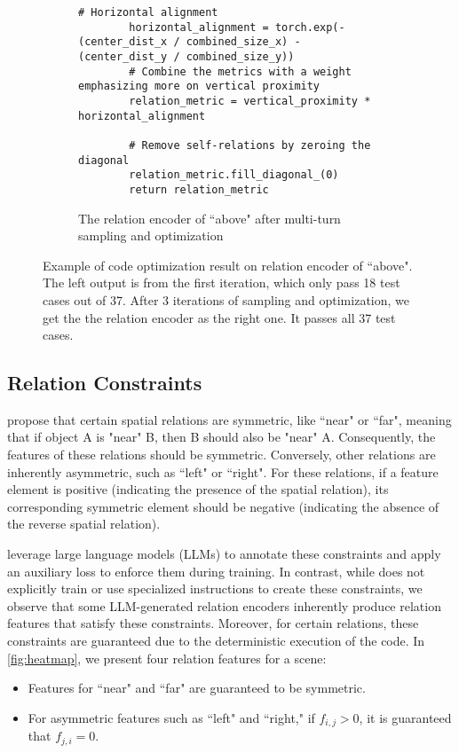 \begin{figure*}[htbp]
\begin{subfigure}{0.45\textwidth}
\begin{lstlisting}[style=pythonstyle]
        # Horizontal alignment
        horizontal_alignment = torch.exp(-(center_dist_x / combined_size_x) - (center_dist_y / combined_size_y))
        # Combine the metrics with a weight emphasizing more on vertical proximity
        relation_metric = vertical_proximity * horizontal_alignment
        
        # Remove self-relations by zeroing the diagonal
        relation_metric.fill_diagonal_(0)
        return relation_metric
\end{lstlisting}
        \caption{The relation encoder of ``above" after multi-turn sampling and optimization}
        \label{fig:subfig-b}
    \end{subfigure}
    
    \caption{Example of code optimization result on relation encoder of ``above". The left output is from the first iteration, which only pass 18 test cases out of 37. After 3 iterations of sampling and optimization, we get the the relation encoder as the right one. It passes all 37 test cases.}
    \label{fig:main}
\end{figure*}

\subsection{Relation Constraints}
\cite{feng2024naturally} propose that certain spatial relations are symmetric, like ``near" or ``far", meaning that if object A is "near" B, then B should also be "near" A. 
Consequently, the features of these relations should be symmetric.
Conversely, other relations are inherently asymmetric, such as ``left" or ``right". For these relations, if a feature element is positive (indicating the presence of the spatial relation), its corresponding symmetric element should be negative (indicating the absence of the reverse spatial relation).

\cite{feng2024naturally} leverage large language models (LLMs) to annotate these constraints and apply an auxiliary loss to enforce them during training. In contrast, while \ourmethod does not explicitly train or use specialized instructions to create these constraints, we observe that some LLM-generated relation encoders inherently produce relation features that satisfy these constraints. Moreover, for certain relations, these constraints are guaranteed due to the deterministic execution of the code. In \autoref{fig:heatmap}, we present four relation features for a scene:

\begin{itemize} 
    \item Features for ``near" and ``far" are guaranteed to be symmetric.
    \item For asymmetric features such as ``left" and ``right," if $f_{i, j} > 0$, it is guaranteed that $f_{j, i} = 0$.
\end{itemize}

